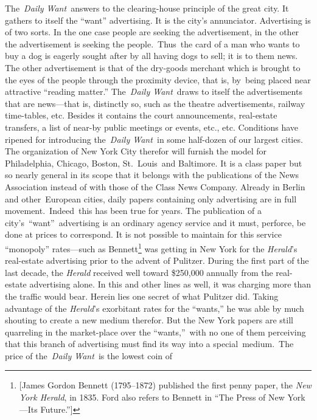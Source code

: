 \documentclass[openany,nobib]{tufte-book}
\begin{document}
The~\emph{Daily Want~}answers to the clearing-house principle of the
great city. It gathers to itself the ``want'' advertising. It is the
city's annunciator. Advertising is of two sorts. In the one case people
are seeking the advertisement, in the other the advertisement is seeking
the people.~Thus~the card of a man who wants to buy a dog is eagerly
sought after by all having dogs to sell; it is to them news. The other
advertisement is that of the dry-goods merchant which is brought to the
eyes of the people through the proximity device, that is, by~being
placed near attractive ``reading matter.'' The~\emph{Daily Want}~draws
to itself the advertisements that are news---that is, distinctly so,
such as the theatre advertisements, railway time-tables, etc. Besides it
contains the court announcements, real-estate transfers, a list of
near-by public meetings or events, etc., etc. Conditions have ripened
for introducing the~\emph{Daily Want~}in some half-dozen of our largest
cities. The organization of New York City therefor will furnish the
model for Philadelphia, Chicago, Boston, St.~Louis~and Baltimore. It is
a class paper but so nearly general in its scope that it belongs with
the publications of the News Association instead of with those of the
Class News Company. Already in Berlin and other~European cities, daily
papers containing only advertising are in full movement.~Indeed~this has
been true for years. The publication of a city's~``want''~advertising is
an ordinary agency service and it must, perforce, be done at prices to
correspond. It is not possible to maintain for this service ``monopoly''
rates---such as Bennett\footnote{{[}James Gordon Bennett (1795--1872)
  published the first penny paper, the \emph{New York Herald}, in 1835.
  Ford also refers to Bennett in ``The Press of New York---Its
  Future.''{]}} was getting in New York for the \emph{Herald}'s
real-estate advertising prior to the advent of Pulitzer. During the
first part of the last decade, the \emph{Herald} received well toward
\$250,000 annually from the real-estate advertising alone. In this and
other lines as well, it was charging more than the traffic would bear.
Herein lies one secret of what Pulitzer did. Taking advantage of the
\emph{Herald}'s exorbitant rates for the ``wants,'' he was able by much
shouting to create a new medium therefor. But the New York papers are
still quarreling in the market-place over the ``wants,''~with no one of
them perceiving that this branch of advertising must find its way into a
special~medium.~The price of the\emph{~Daily Want~}is the lowest coin of
\end{document}
